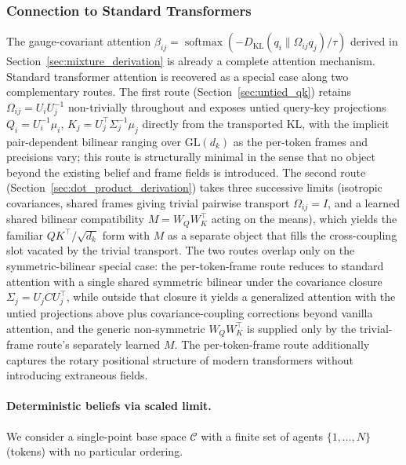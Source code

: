 \documentclass[11pt]{article}
\begin{document}
\subsubsection{Connection to Standard Transformers}

The gauge-covariant attention $\beta_{ij} = \operatorname{softmax}(-D_{\mathrm{KL}}(q_i \| \Omega_{ij} q_j)/\tau)$ derived in Section~\ref{sec:mixture_derivation} is already a complete attention mechanism. Standard transformer attention is recovered as a special case along two complementary routes. The first route (Section~\ref{sec:untied_qk}) retains $\Omega_{ij} = U_iU_j^{-1}$ non-trivially throughout and exposes untied query-key projections $Q_i = U_i^{-1}\mu_i$, $K_j = U_j^\top\Sigma_j^{-1}\mu_j$ directly from the transported KL, with the implicit pair-dependent bilinear ranging over $\mathrm{GL}(d_k)$ as the per-token frames and precisions vary; this route is structurally minimal in the sense that no object beyond the existing belief and frame fields is introduced. The second route (Section~\ref{sec:dot_product_derivation}) takes three successive limits (isotropic covariances, shared frames giving trivial pairwise transport $\Omega_{ij} = I$, and a learned shared bilinear compatibility $M = W_QW_K^\top$ acting on the means), which yields the familiar $QK^\top / \sqrt{d_k}$ form with $M$ as a separate object that fills the cross-coupling slot vacated by the trivial transport. The two routes overlap only on the symmetric-bilinear special case: the per-token-frame route reduces to standard attention with a single shared symmetric bilinear under the covariance closure $\Sigma_j = U_jCU_j^\top$, while outside that closure it yields a generalized attention with the untied projections above plus covariance-coupling corrections beyond vanilla attention, and the generic non-symmetric $W_QW_K^\top$ is supplied only by the trivial-frame route's separately learned $M$. The per-token-frame route additionally captures the rotary positional structure of modern transformers without introducing extraneous fields.

\paragraph{Deterministic beliefs via scaled limit.}

We consider a single-point base space $\mathcal{C}$ with a finite set of agents $\{1,\dots,N\}$ (tokens) with no particular ordering.
\end{document}
